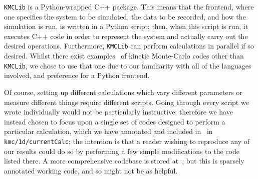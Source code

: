 \texttt{KMCLib} is a Python-wrapped C++ package. This means that the frontend, where one specifies the
system to be simulated, the data to be recorded, and how the simulation is run, is written in a Python
script; then, when this script is run, it executes C++ code in order to represent the system and
actually carry out the desired operations. Furthermore, \texttt{KMCLib} can perform calculations in
parallel if so desired. Whilst there exist examples~\cite{hoffmann2014kmos, spparks} of kinetic
Monte-Carlo codes other than \texttt{KMCLib}, we chose to use that one due to our familiarity with all
of the languages involved, and preference for a Python frontend.

Of course, setting up different calculations which vary different parameters or measure different things
require different scripts. Going through every script we wrote individually would not be particularly instructive;
therefore we have instead chosen to focus
upon a single set of codes designed to perform a particular calculation, which we have annotated and 
included in~\cite{hellier2019a} in \texttt{kmc/1d/currentCalc}; the intention is that a reader wishing to reproduce any of our results could do
so by performing a few simple modifications to the code listed there. A more comprehensive codebase is
stored at~\cite{hellier2019b}, but this is sparsely annotated working code, and so might not be as helpful.

